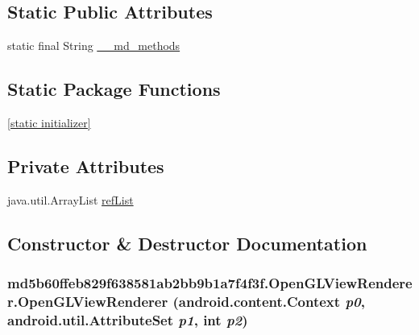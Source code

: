 \subsection*{Static Public Attributes}
\begin{CompactItemize}
\item 
static final String \hyperlink{classmd5b60ffeb829f638581ab2bb9b1a7f4f3f_1_1_open_g_l_view_renderer_55f0f0092c5140b38cf1f7aba5594097}{\_\-\_\-md\_\-methods}
\end{CompactItemize}
\subsection*{Static Package Functions}
\begin{CompactItemize}
\item 
\hyperlink{classmd5b60ffeb829f638581ab2bb9b1a7f4f3f_1_1_open_g_l_view_renderer_4e0925629cda86b2b3a4e354456f87b6}{\mbox{[}static initializer\mbox{]}}
\end{CompactItemize}
\subsection*{Private Attributes}
\begin{CompactItemize}
\item 
java.util.ArrayList \hyperlink{classmd5b60ffeb829f638581ab2bb9b1a7f4f3f_1_1_open_g_l_view_renderer_05996987d150ac96a4aabf32c1f4901c}{refList}
\end{CompactItemize}


\subsection{Constructor \& Destructor Documentation}
\hypertarget{classmd5b60ffeb829f638581ab2bb9b1a7f4f3f_1_1_open_g_l_view_renderer_28f906bba65e6ae686fcd64c6f4d3c76}{
\subsubsection[{OpenGLViewRenderer}]{\setlength{\rightskip}{0pt plus 5cm}md5b60ffeb829f638581ab2bb9b1a7f4f3f.OpenGLViewRenderer.OpenGLViewRenderer (android.content.Context {\em p0}, \/  android.util.AttributeSet {\em p1}, \/  int {\em p2})}}
\label{classmd5b60ffeb829f638581ab2bb9b1a7f4f3f_1_1_open_g_l_view_renderer_28f906bba65e6ae686fcd64c6f4d3c76}


